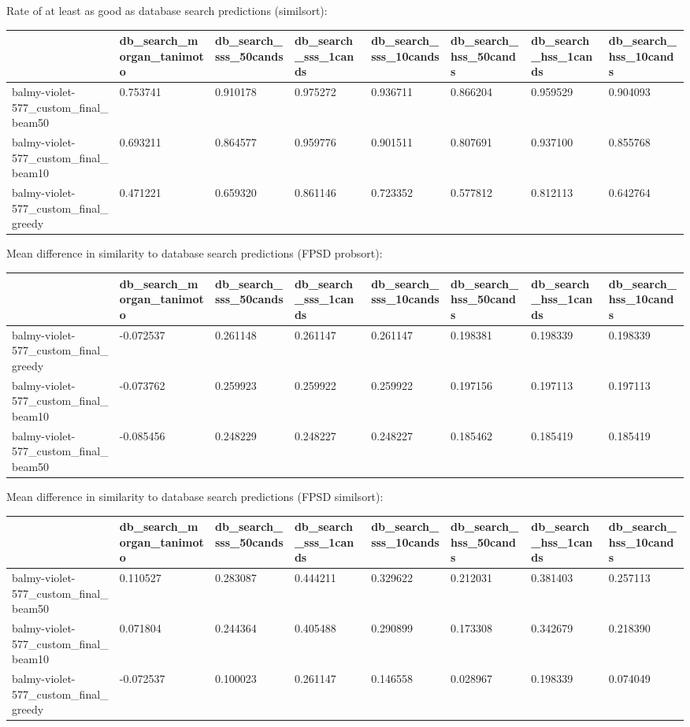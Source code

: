 Rate of at least as good as database search predictions (similsort):
\begin{tabular}{llllllll}
\toprule
 & db_search_morgan_tanimoto & db_search_sss_50cands & db_search_sss_1cands & db_search_sss_10cands & db_search_hss_50cands & db_search_hss_1cands & db_search_hss_10cands \\
\midrule
balmy-violet-577_custom_final_beam50 & 0.753741 & 0.910178 & 0.975272 & 0.936711 & 0.866204 & 0.959529 & 0.904093 \\
balmy-violet-577_custom_final_beam10 & 0.693211 & 0.864577 & 0.959776 & 0.901511 & 0.807691 & 0.937100 & 0.855768 \\
balmy-violet-577_custom_final_greedy & 0.471221 & 0.659320 & 0.861146 & 0.723352 & 0.577812 & 0.812113 & 0.642764 \\
\bottomrule
\end{tabular}



Mean difference in similarity to database search predictions (FPSD probsort):
\begin{tabular}{llllllll}
\toprule
 & db_search_morgan_tanimoto & db_search_sss_50cands & db_search_sss_1cands & db_search_sss_10cands & db_search_hss_50cands & db_search_hss_1cands & db_search_hss_10cands \\
\midrule
balmy-violet-577_custom_final_greedy & -0.072537 & 0.261148 & 0.261147 & 0.261147 & 0.198381 & 0.198339 & 0.198339 \\
balmy-violet-577_custom_final_beam10 & -0.073762 & 0.259923 & 0.259922 & 0.259922 & 0.197156 & 0.197113 & 0.197113 \\
balmy-violet-577_custom_final_beam50 & -0.085456 & 0.248229 & 0.248227 & 0.248227 & 0.185462 & 0.185419 & 0.185419 \\
\bottomrule
\end{tabular}



Mean difference in similarity to database search predictions (FPSD similsort):
\begin{tabular}{llllllll}
\toprule
 & db_search_morgan_tanimoto & db_search_sss_50cands & db_search_sss_1cands & db_search_sss_10cands & db_search_hss_50cands & db_search_hss_1cands & db_search_hss_10cands \\
\midrule
balmy-violet-577_custom_final_beam50 & 0.110527 & 0.283087 & 0.444211 & 0.329622 & 0.212031 & 0.381403 & 0.257113 \\
balmy-violet-577_custom_final_beam10 & 0.071804 & 0.244364 & 0.405488 & 0.290899 & 0.173308 & 0.342679 & 0.218390 \\
balmy-violet-577_custom_final_greedy & -0.072537 & 0.100023 & 0.261147 & 0.146558 & 0.028967 & 0.198339 & 0.074049 \\
\bottomrule
\end{tabular}



